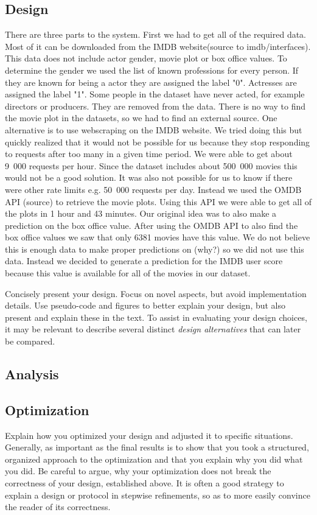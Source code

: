 \subsection{Design} 
There are three parts to the system. First we had to get all of the required data. Most of it can be downloaded from the IMDB website(source to imdb/interfaces). This data does not include actor gender, movie plot or box office values. To determine the gender we used the list of known professions for every person. If they are known for being a actor they are assigned the label "0". Actresses are assigned the label "1". Some people in the dataset have never acted, for example directors or producers. They are removed from the data. There is no way to find the movie plot in the datasets, so we had to find an external source. One alternative is to use webscraping on the IMDB website. We tried doing this but quickly realized that it would not be possible for us because they stop responding to requests after too many in a given time period. We were able to get about 9~000 requests per hour. Since the dataset includes about 500~000 movies this would not be a good solution. It was also not possible for us to know if there were other rate limits e.g. 50~000 requests per day. Instead we used the OMDB API (source) to retrieve the movie plots. Using this API we were able to get all of the plots in 1 hour and 43 minutes. Our original idea was to also make a prediction on the box office value. After using the OMDB API to also find the box office values we saw that only 6381 movies have this value. We do not believe this is enough data to make proper predictions on (why?) so we did not use this data. Instead we decided to generate a prediction for the IMDB user score because this value is available for all of the movies in our dataset.

Concisely present your design. Focus on novel aspects,
but avoid implementation details. Use pseudo-code and figures to better
explain your design, but also present and explain these in the text.
%
To assist in evaluating your design choices, it may be relevant to describe
several distinct \textit{design alternatives} that can later be compared.

\subsection{Analysis}

\subsection{Optimization} Explain how you optimized your design and 
adjusted it to specific situations.
%
Generally, as important as the final results is to show
that you took a structured, organized approach to the optimization
and that you explain why you did what you did.
%
Be careful to argue, why your optimization does not break the 
correctness of your design, established above.
%
It is often a good strategy to explain a design or protocol in stepwise refinements,
so as to more easily convince the reader of its correctness. 

